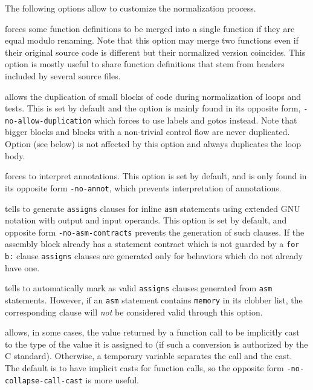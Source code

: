 The following options allow to customize the normalization process.
\begin{description}
\item {} forces some function
  definitions to be merged into a single function if they are equal
  modulo renaming. Note that this option may merge two functions even
  if their original source code is different but their normalized
  version coincides. This option is mostly useful to share function
  definitions that stem from headers included by several source files.

\item {} allows the duplication of small
  blocks of code during normalization of loops and tests. This is set
  by default and the option is mainly found in its opposite form,
 \texttt{-no-allow-duplication} which forces \FramaC to use labels and
 gotos instead. Note that bigger blocks and blocks with a non-trivial
 control flow are never duplicated. Option  (see
 below) is not affected by this option and always duplicates the loop body.

\item {} forces \FramaC to interpret \acsl annotations.
This option is set by default, and is only found in its opposite form
\texttt{-no-annot}, which prevents interpretation of
\acsl annotations.

\item {} tells \FramaC to generate \lstinline|assigns|
clauses for inline \lstinline|asm| statements using extended GNU notation
with output and input operands. This option is set by default, and opposite form
\texttt{-no-asm-contracts} prevents the generation of such clauses.
If the assembly block
already has a statement contract which is not guarded by a \lstinline|for b:|
clause \lstinline|assigns| clauses are generated only for behaviors which do not
already have one.

\item {} tells \FramaC to
automatically mark as valid \lstinline|assigns| clauses generated from
\lstinline|asm| statements. However, if an \lstinline|asm| statement contains
\lstinline|memory| in its clobber list, the corresponding clause will \emph{not}
be considered valid through this option.

\item {} allows, in some cases,
the value returned by
a function call to be implicitly cast to the type of the value it is
assigned to (if such a conversion is authorized by the C
standard). Otherwise, a temporary variable separates the call and the
cast. The default is to have implicit casts for function calls, so the
opposite form \texttt{-no-collapse-call-cast} is more useful.


\end{description}
